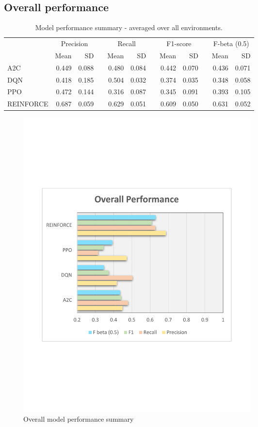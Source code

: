 \documentclass[a4paper, 12pt]{article}
\newcommand{\rowspace}[1]{\renewcommand{\arraystretch}{#1}}
\begin{document}
\subsection{Overall performance}
\begin{table}[h]\centering
	\sffamily
	\rowspace{1.3}
	\begin{tabular}{@{}l rr c rr c rr c rr@{}}
		\arrayrulecolor{black!40}\toprule
		& \multicolumn{2}{c}{Precision} & \phantom{i} & \multicolumn{2}{c}{Recall} & \phantom{i} & \multicolumn{2}{c}{F1-score} & \phantom{i} & \multicolumn{2}{c}{F-beta (0.5)} \\
		\cmidrule{2-3} \cmidrule{5-6} \cmidrule{8-9} \cmidrule{11-12} 
		
		&Mean &SD & &Mean &SD & &Mean &SD& &Mean & SD\\ \midrule
		
		A2C & 0.449 & 0.088 & &0.480 & 0.084 & & 0.442 & 0.070 & &0.436 &0.071 \\
		DQN & 0.418 & 0.185 & &0.504 & 0.032 & & 0.374 & 0.035 & &0.348 &0.058 \\
		PPO & 0.472 & 0.144 & &0.316 & 0.087 & & 0.345 & 0.091 & &0.393 &0.105 \\
		REINFORCE & \textcolor{dblue}{0.687} & 0.059 & &\textcolor{dblue}{0.629} & 0.051 & & \textcolor{dblue}{0.609} & 0.050 & &\textcolor{dblue}{0.631} &0.052 \\
		
		\bottomrule
	\end{tabular}
	\caption{Model performance summary - averaged over all environments.}
	\label{tbl:OverallSummary}
\end{table}
\begin{figure}[h]
	\centering
	\includegraphics[width=0.6\textwidth, trim={1.5cm 7cm 1cm 7cm}]{images/OverallPlot.pdf}  
	\caption{Overall model performance summary}
	\label{fig:OverallSummary}
\end{figure}
\end{document}
